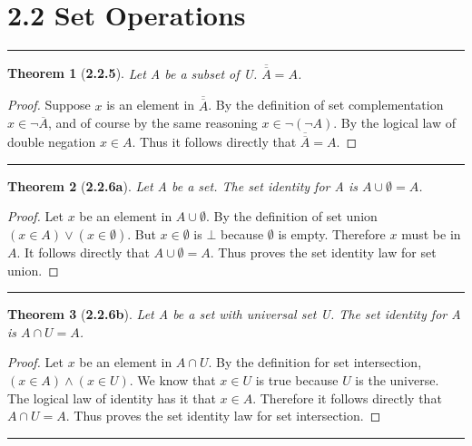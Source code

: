 \documentclass[a4paper, 12pt]{article}
\theoremstyle{plain}
\newtheorem*{theorem*}{Theorem}
\begin{document}
\section*{2.2 Set Operations}
\begin{center}
    \rule{5.4in}{1pt}
\end{center}


\begin{theorem*}[\textbf{2.2.5}]
    Let A be a subset of U. $\overline{\overline{A}} = A$.
\end{theorem*}

\begin{proof}
    Suppose $x$ is an element in $\overline{\overline{A}}$. By the definition of set complementation 
    $x \in \lnot \overline{A}$, and of course by the same reasoning $x \in \lnot ( \lnot A)$. By the 
    logical law of double negation $x \in A$. Thus it follows directly that 
    $\overline{\overline{A}} = A$.
\end{proof}
\begin{center}
    \rule{5.4in}{1pt}
\end{center}


\begin{theorem*}[\textbf{2.2.6a}]
    Let A be a set. The set identity for A is $A \cup \emptyset = A$.
\end{theorem*}

\begin{proof}
    Let $x$ be an element in $A \cup \emptyset$. By the definition of set union \newline 
    $(x \in A) \lor (x \in \emptyset)$. But $x \in \emptyset$ is $\bot$ because $\emptyset$ is 
    empty. Therefore $x$ must be in $A$. It follows directly that $A \cup \emptyset = A$. Thus 
    proves the set identity law for set union.
\end{proof}
\begin{center}
    \rule{5.4in}{1pt}
\end{center}


\begin{theorem*}[\textbf{2.2.6b}]
    Let A be a set with universal set U. The set identity for A is $A \cap U = A$.
\end{theorem*}

\begin{proof}
    Let $x$ be an element in $A \cap U$. By the definition for set intersection, 
    $(x \in A) \land (x \in U)$. We know that $x \in U$ is true because $U$ is the 
    universe. The logical law of identity has it that $x \in A$. Therefore it follows 
    directly that $A \cap U = A$. Thus proves the set identity law for set intersection.
\end{proof}
\begin{center}
    \rule{5.4in}{1pt}
\end{center}
\end{document}
